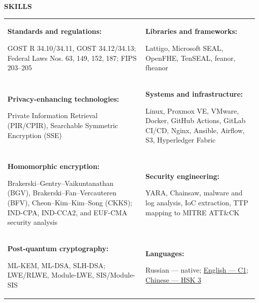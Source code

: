 \documentclass[11pt,a4paper]{article}
\newcommand{\cvrow}[2]{%
  \noindent
  \begin{minipage}[t]{0.145\textwidth}
    \vspace{0pt}%
    \raggedright
    \fontsize{8.5}{10}\selectfont
    \bfseries\MakeUppercase{#1}
  \end{minipage}%
  \hfill
  \begin{minipage}[t]{0.835\textwidth}
    \vspace{0pt}%
    #2
  \end{minipage}\par
}
\newcommand{\skillcell}[2]{%
  \textbf{#1}\par
  #2
}
\begin{document}
\cvrow{Skills}{%
  \begin{tabularx}{\linewidth}
    {@{}>{\raggedright\arraybackslash}X
    @{\hspace{1.2em}}
    >{\raggedright\arraybackslash}X@{}}

    \skillcell{Standards and regulations:}{%
      GOST R 34.10/34.11, GOST 34.12/34.13;
      Federal Laws Nos. 63, 149, 152, 187; FIPS 203--205}
    &
    \skillcell{Libraries and frameworks:}{%
      Lattigo, Microsoft SEAL, OpenFHE, TenSEAL,
      feanor, fheanor}
    \\[0.20em]

    \skillcell{Privacy-enhancing technologies:}{%
      Private Information Retrieval (PIR/CPIR),
      Searchable Symmetric Encryption (SSE)}
    &
    \skillcell{Systems and infrastructure:}{%
      Linux, Proxmox VE, VMware, Docker,
      GitHub Actions, GitLab CI/CD, Nginx, Ansible,
      Airflow, S3,
      Hyperledger Fabric}
    \\[0.20em]

    \skillcell{Homomorphic encryption:}{%
      Brakerski--Gentry--Vaikuntanathan (BGV),
      Brakerski--Fan--Vercauteren (BFV),
      Cheon--Kim--Kim--Song (CKKS);
      IND-CPA, IND-CCA2, and EUF-CMA security analysis}
    &
    \skillcell{Security engineering:}{%
      YARA, Chainsaw, malware and log analysis,
      IoC extraction, TTP mapping to MITRE ATT\&CK}
    \\[0.20em]

    \skillcell{Post-quantum cryptography:}{%
      ML-KEM, ML-DSA, SLH-DSA;
      LWE/RLWE, Module-LWE, SIS/Module-SIS}
    &
    \skillcell{Languages:}{%
      Russian --- native;
      \href{https://iasenovets.github.io/files/toefl_8cd5f4a2b8ec8f34da49ea0faeef43f1.pdf}{English --- C1};
      \href{https://admin.chinesetest.cn/queryScore.do?sid=c2tActR9Wb\%2704b861aefbdc5e9fd0b44afa717d08cbceb0720e582ce25f\%2724d7sWsQ5nVUQSwD}
        {Chinese --- HSK 3}}
  \end{tabularx}
}

\vspace{0.50em}
\end{document}
